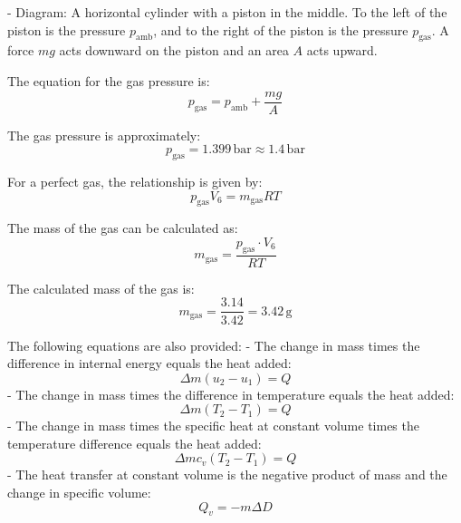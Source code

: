 - Diagram: A horizontal cylinder with a piston in the middle. To the left of the piston is the pressure \( p_{\text{amb}} \), and to the right of the piston is the pressure \( p_{\text{gas}} \). A force \( mg \) acts downward on the piston and an area \( A \) acts upward.

The equation for the gas pressure is:
\[ p_{\text{gas}} = p_{\text{amb}} + \frac{mg}{A} \]

The gas pressure is approximately:
\[ p_{\text{gas}} = 1.399 \, \text{bar} \approx 1.4 \, \text{bar} \]

For a perfect gas, the relationship is given by:
\[ p_{\text{gas}} V_6 = m_{\text{gas}} RT \]

The mass of the gas can be calculated as:
\[ m_{\text{gas}} = \frac{p_{\text{gas}} \cdot V_6}{RT} \]

The calculated mass of the gas is:
\[ m_{\text{gas}} = \frac{3.14}{3.42} = 3.42 \, \text{g} \]

The following equations are also provided:
- The change in mass times the difference in internal energy equals the heat added:
  \[ \Delta m (u_2 - u_1) = Q \]
- The change in mass times the difference in temperature equals the heat added:
  \[ \Delta m (T_2 - T_1) = Q \]
- The change in mass times the specific heat at constant volume times the temperature difference equals the heat added:
  \[ \Delta m c_v (T_2 - T_1) = Q \]
- The heat transfer at constant volume is the negative product of mass and the change in specific volume:
  \[ Q_v = -m \Delta D \]